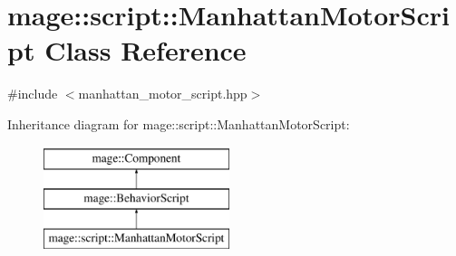 \hypertarget{classmage_1_1script_1_1_manhattan_motor_script}{}\section{mage\+:\+:script\+:\+:Manhattan\+Motor\+Script Class Reference}
\label{classmage_1_1script_1_1_manhattan_motor_script}


{\ttfamily \#include $<$manhattan\+\_\+motor\+\_\+script.\+hpp$>$}

Inheritance diagram for mage\+:\+:script\+:\+:Manhattan\+Motor\+Script\+:\begin{figure}[H]
\begin{center}
\leavevmode
\includegraphics[height=3.000000cm]{classmage_1_1script_1_1_manhattan_motor_script}
\end{center}
\end{figure}
